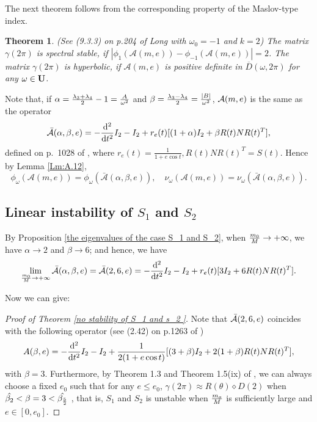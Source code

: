 \documentclass[11pt]{article}
\newtheorem{theorem}[lemma]{Theorem}
\def\d{{\mathrm{d}}}
\def\U{{\bf U}}
\def\om{{\omega}}
\def\cA{{\cal A}}
\begin{document}
The next theorem follows from the corresponding property
of the Maslov-type index.

\begin{theorem} \label{criteria of spectral stability}
(See (9.3.3) on p.204 of Long \cite{Lon4} with $\omega_0=-1$  and $k=2$)
The matrix $\gamma(2\pi)$ is spectral stable,
if $|\phi_{1}(\mathcal{A}(m,e))-\phi_{-1}(\mathcal{A}(m,e))|=2$.
The matrix $\gamma(2\pi)$ is hyperbolic,
if $\mathcal{A}(m,e)$ is positive definite
in $\overline{D}(\omega,2\pi)$ for any $\omega\in\U$.

    
\end{theorem}

Note that, if
$\alpha=\frac{\lambda_3+\lambda_4}{2}-1={A\over\om^2}$ and
$\beta=\frac{\lambda_3-\lambda_4}{2}={|B|\over\om^2}$, $\cA(m,e)$ is the same as the operator
\begin{equation}\label{bar.A}
    \bar\cA(\alpha,\beta,e)= -\frac{\d^2}{\d t^2}I_2  -I_2 +
    r_e(t)[(1+\alpha)I_2+\beta R(t)NR(t)^T],
\end{equation}
defined on p.~1028
of \cite{Hu2020},
where $r_e(t)=\frac{1}{1+e\cos t},R(t)NR(t)^T=S(t)$.   
Hence by Lemma \ref{Lm:A.12},
$$
\phi_{\omega}(\mathcal{A}(m,e))
=\phi_{\omega}(\bar{\mathcal{A}}(\alpha,\beta,e)),\quad
\nu_{\omega}(\mathcal{A}(m,e))
=\nu_{\omega}(\bar{\mathcal{A}}(\alpha,\beta,e)).
$$

\subsection{Linear instability of \texorpdfstring{$S_1$}{S\_1} and \texorpdfstring{$S_2$}{S\_2}}
By Proposition \ref{the eigenvalues of the case S_1 and S_2},
when ${m_0\over M}\to+\infty$,
we have $\alpha\to2$ and $\beta\to6$;
and hence, we have
\begin{eqnarray}
    \lim_{{m_0\over M}\to+\infty}\bar\cA(\alpha,\beta,e)=\bar\cA(2,6,e)= -\frac{\d^2}{\d t^2}I_2  -I_2 +
    r_e(t)[3I_2+6 R(t)NR(t)^T].
\end{eqnarray}

Now we can give:

\begin{proof}[Proof of Theorem \ref{no stability of S_1 and s_2 }]
Note that $\bar\cA(2,6,e)$
coincides with the following operator (see (2.42) on p.1263 of \cite{Zhou2017})
\begin{equation}
    A(\beta,e) = -\frac{\d^2}{\d t^2}I_2  -I_2 +
   {1\over2(1+e\cos{t})}[(3+\beta)I_2+2(1+\beta)R(t)NR(t)^T],
\end{equation}
with $\beta=3$. Furthermore, by Theorem 1.3 and Theorem 1.5(ix) of \cite{Zhou2017}, we can always choose a fixed $e_0$ such that for any $e\leq e_0$, $\gamma(2\pi)\approx R(\theta)\diamond D(2)$ when $\hat{\beta_2}<\beta=3<\hat{\beta_{5\over 2}}$ , that is, $S_1$ and $S_2$ is unstable when ${m_o\over M}$ is sufficiently large and $e\in [0,e_0]$. 
\end{proof}
\end{document}
